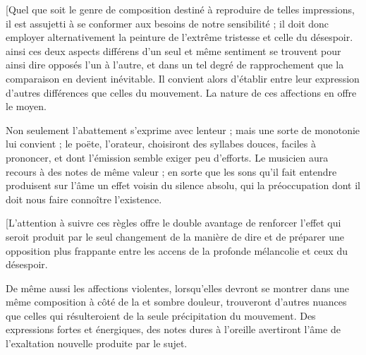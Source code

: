 \documentclass[11pt,a4paper]{article}
\begin{document}

[Quel que soit le genre de composition destiné à reproduire de telles
impressions, il est assujetti à se conformer aux besoins de notre
sensibilité ; il doit donc employer 
alternativement la peinture de l'extrême  tristesse
 et celle du désespoir. ainsi ces deux aspects
différens d'un seul et même sentiment se trouvent pour ainsi dire
opposés l'un à l'autre, et dans un tel degré de rapprochement que la
comparaison en devient inévitable. Il convient alors d'établir entre
leur expression   d'autres différences
 que celles du mouvement. La nature de ces affections
en offre le moyen.

Non seulement l'abattement s'exprime avec lenteur ; mais une sorte de
monotonie lui convient ; le poëte, l'orateur, choisiront des syllabes
douces, faciles à prononcer, et dont l'émission semble 
exiger peu d'efforts. Le musicien aura recours à des notes
 de même valeur ; en sorte que les sons qu'il fait
entendre produisent sur l'âme  un effet 
voisin du silence absolu, qui  
  la préoccupation dont il doit nous
faire connoître l'existence.

[L'attention à suivre ces règles offre le double  avantage
de renforcer l'effet qui seroit produit par le seul changement de la
manière de dire et de préparer une opposition plus frappante entre les
accens de la profonde mélancolie et ceux du désespoir.

De même aussi les affections violentes, lorsqu'elles devront se montrer
dans une même composition à côté de la  et
sombre douleur, trouveront d'autres nuances que celles qui résulteroient
de la seule précipitation du mouvement. Des expressions fortes et
énergiques, des notes dures à l'oreille avertiront l'âme de l'exaltation
nouvelle produite par le sujet.
\end{document}
